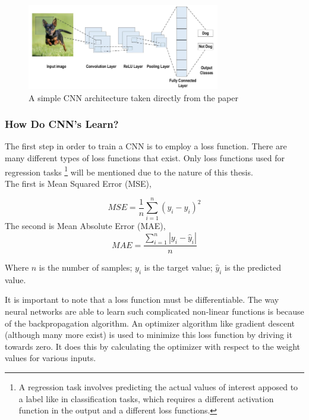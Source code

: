 \begin{figure}
	\includegraphics[width=0.75\textwidth]{../Figures/classical_cnn.png}
	\centering
	\caption[CNN]{A simple CNN architecture taken directly from the  paper \cite{alzubaidi2021review}} 
	\label{simple_cnn}
\end{figure}

\subsubsection*{How Do CNN's Learn?}
The first step in order to train a CNN is to employ a loss function. There are many different types of loss functions that exist. Only loss functions used for regression tasks \footnote{A regression task involves predicting the actual values of interest apposed to a label like in classification tasks, which requires a different activation function in the output and a different loss functions.} will be mentioned due to the nature of this thesis. \\

The first is Mean Squared Error (MSE),

\begin{equation}
	\label{eq:2.2}
	MSE = \frac{1}{n}\sum_{i=1}^{n}\left(y_{i} - \hat{y}_{i}\right)^{2}
\end{equation}
The second is Mean Absolute Error (MAE),
\begin{equation}
	\label{eq:2.3}
	MAE = \frac{\sum_{i=1}^{n}\left|y_{i} - \hat{y}_{i}\right|}{n}
\end{equation}

Where $n$ is the number of samples; $y_{i}$ is the target value; $\hat{y}_{i}$ is the predicted value.



It is important to note that a loss function must be differentiable. The way neural networks are able to learn such complicated non-linear functions is because of the backpropagation algorithm. An optimizer algorithm like gradient descent (although many more exist) is used to minimize this loss function by driving it towards zero. It does this by calculating the optimizer with respect to the weight values for various inputs.

